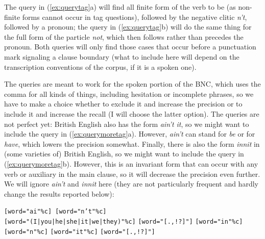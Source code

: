 The query in (\ref{ex:querytag}a) will find all finite form of the verb to be (as non-finite forms cannot occur in tag questions), followed by the negative clitic \textit{n't}, followed by a pronoun; the query in (\ref{ex:querytag}b) will do the same thing for the full form of the particle \textit{not}, which then follows rather than precedes the pronoun. Both queries will only find those cases that occur before a punctuation mark signaling a clause boundary (what to include here will depend on the transcription conventions of the corpus, if it is a spoken one).

The queries are meant to work for the spoken portion of the BNC, which uses the comma for all kinds of things, including hesitation or incomplete phrases, so we have to make a choice whether to exclude it and increase the precision or to include it and increase the recall (I will choose the latter option). The queries are not perfect yet: British English also has the form \textit{ain't it}, so we might want to include the query in (\ref{ex:querymoretag}a). However, \textit{ain't} can stand for \textit{be} or for \textit{have}, which lowers the precision somewhat. Finally, there is also the form \textit{innit} in (some varieties of) British English, so we might want to include the query in (\ref{ex:querymoretag}b). However, this is an invariant form that can occur with any verb or auxiliary in the main clause, so it will decrease the precision even further. We will ignore \textit{ain't} and \textit{innit} here (they are not particularly frequent and hardly change the results reported below):

\begin{exe}
\ex
\begin{xlist} 
\label{ex:querymoretag}
\ex  \texttt{[word="ai"\%c] [word="n't"\%c]} \\ 
\texttt{[word="(I|you|he|she|it|we|they)"\%c]} \texttt{[word="[.,!?]"]}
\ex \texttt{[word="in"\%c]} \texttt{[word="n"\%c]} \texttt{[word="it"\%c]} \texttt{[word="[.,!?]"]}
\end{xlist}
\end{exe}


